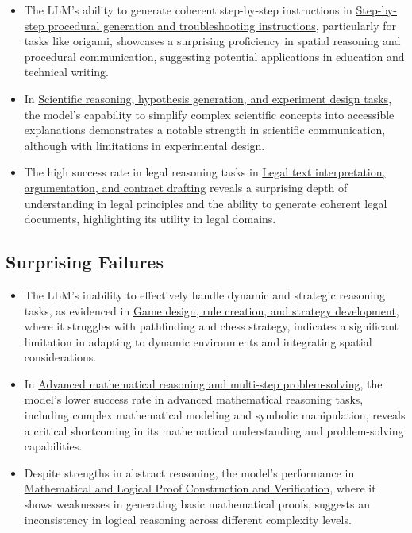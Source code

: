 \documentclass[fleqn,10pt]{wlscirep}
\providecommand{\tightlist}{%
  \setlength{\itemsep}{0pt}\setlength{\parskip}{0pt}}
\begin{document}
\begin{itemize}
\tightlist
\item
  The LLM's ability to generate coherent step-by-step instructions in
  \protect\hyperlink{step-by-step-procedural-generation-and-troubleshooting-instructions}{Step-by-step
  procedural generation and troubleshooting instructions}, particularly
  for tasks like origami, showcases a surprising proficiency in spatial
  reasoning and procedural communication, suggesting potential
  applications in education and technical writing.
\item
  In
  \protect\hyperlink{scientific-reasoning-hypothesis-generation-and-experiment-design-tasks}{Scientific
  reasoning, hypothesis generation, and experiment design tasks}, the
  model's capability to simplify complex scientific concepts into
  accessible explanations demonstrates a notable strength in scientific
  communication, although with limitations in experimental design.
\item
  The high success rate in legal reasoning tasks in
  \protect\hyperlink{legal-text-interpretation-argumentation-and-contract-drafting}{Legal
  text interpretation, argumentation, and contract drafting} reveals a
  surprising depth of understanding in legal principles and the ability
  to generate coherent legal documents, highlighting its utility in
  legal domains.
\end{itemize}

\hypertarget{surprising-failures}{%
\subsection{Surprising Failures}\label{surprising-failures}}

\begin{itemize}
\tightlist
\item
  The LLM's inability to effectively handle dynamic and strategic
  reasoning tasks, as evidenced in
  \protect\hyperlink{game-design-rule-creation-and-strategy-development}{Game
  design, rule creation, and strategy development}, where it struggles
  with pathfinding and chess strategy, indicates a significant
  limitation in adapting to dynamic environments and integrating spatial
  considerations.
\item
  In
  \protect\hyperlink{advanced-mathematical-reasoning-and-multi-step-problem-solving}{Advanced
  mathematical reasoning and multi-step problem-solving}, the model's
  lower success rate in advanced mathematical reasoning tasks, including
  complex mathematical modeling and symbolic manipulation, reveals a
  critical shortcoming in its mathematical understanding and
  problem-solving capabilities.
\item
  Despite strengths in abstract reasoning, the model's performance in
  \protect\hyperlink{mathematical-and-logical-proof-construction-and-verification}{Mathematical
  and Logical Proof Construction and Verification}, where it shows
  weaknesses in generating basic mathematical proofs, suggests an
  inconsistency in logical reasoning across different complexity levels.
\end{itemize}
\end{document}
